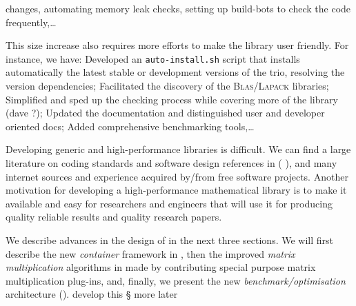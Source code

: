 changes, automating memory leak checks, setting up build-bots to check the code
frequently,\dots
%
\par
%
This size increase also requires more efforts to make the library user friendly. For
instance, we have:
%
Developed an \texttt{auto-install.sh} script that installs automatically the
latest stable or development versions of the trio, resolving the version
dependencies;
%
Facilitated the discovery of the \textsc{Blas}/\textsc{Lapack} libraries;
%
Simplified and sped up the checking process while covering more of the library
(\danger dave ?);
%
Updated the documentation and distinguished user and developer oriented docs;
%
Added comprehensive benchmarking tools,\dots
%
%
\par
%
Developing generic and high-performance libraries is difficult. We can find a
large literature on coding standards and software design references in (\cf{}
\cite{alexandrescu:01:modern,gamma:95:design,sutter:05:cpp,stroustrup1994design,Douglas:05:GPHP}),
and many internet sources and experience acquired by/from free
software projects.  
Another motivation for developing a high-performance
mathematical library is to make it available and easy for researchers and
engineers that will use it for producing quality reliable results and quality
research papers.
%
\par
%
We describe advances in the design of \linbox in the next
three sections. We will first describe the new \emph{container} framework in
, then the improved \emph{matrix multiplication} algorithms
in  made by contributing special purpose matrix multiplication
plug-ins, and, finally, we present the new \emph{benchmark/optimisation}
architecture ().
%
\danger develop this § more later
